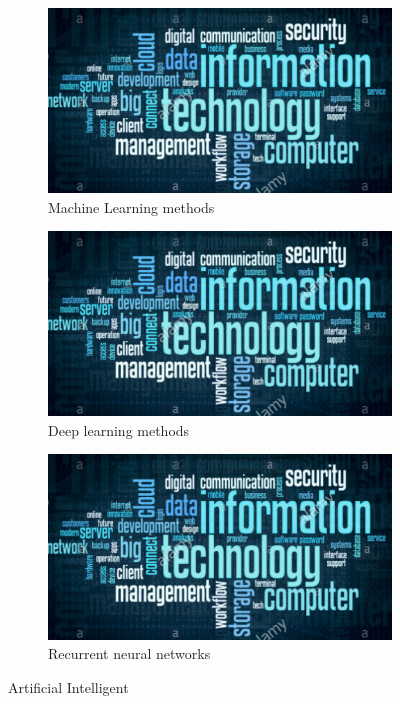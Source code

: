 \begin{figure}[ht]
\centering
    \begin{subfigure}{.3\textwidth}
         \centering
          \includegraphics[width=.8\linewidth]{figures/samples/it.png}
           \caption{Machine Learning methods}
        \label{fig:sub1}
        \end{subfigure}%
    \begin{subfigure}{.3\textwidth}
         \centering
        \includegraphics[width=.8\linewidth]{figures/samples/it.png}
        \caption{Deep learning methods}
        \label{fig:sub2}
        \end{subfigure}
            \begin{subfigure}{.3\textwidth}
         \centering
        \includegraphics[width=.8\linewidth]{figures/samples/it.png}
        \caption{Recurrent neural networks}
        \label{fig:sub3}
        \end{subfigure}
        \caption{Artificial Intelligent}
\label{fig:test}
\end{figure}


